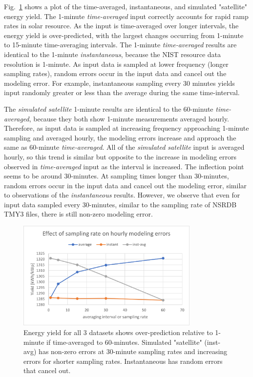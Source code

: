\documentclass[conference]{IEEEtran}
\begin{document}
Fig.~\ref{fig:NIST-energy-yield} shows a plot of the time-averaged, instantaneous, and simulated "satellite" energy yield. The 1-minute \emph{time-averaged} input correctly accounts for rapid ramp rates in solar resource. As the input is time-averaged over longer intervals, the energy yield is over-predicted, with the largest changes occurring from 1-minute to 15-minute time-averaging intervals. The 1-minute \emph{time-averaged} results are identical to the 1-minute \emph{instantaneous}, because the NIST resource data resolution is 1-minute. As input data is sampled at lower frequency (longer sampling rates), random errors occur in the input data and cancel out the modeling error. For example, instantaneous sampling every 30 minutes yields input randomly greater or less than the average during the same time-interval.

The \emph{simulated satellite} 1-minute results are identical to the 60-minute \emph{time-averaged}, because they both show 1-minute measurements averaged hourly. Therefore, as input data is sampled at increasing frequency approaching 1-minute sampling and averaged hourly, the modeling errors increase and approach the same as 60-minute \emph{time-averaged}. All of the \emph{simulated satellite} input is averaged hourly, so this trend is similar but opposite to the increase in modeling errors observed in \emph{time-averaged} input as the interval is increased. The inflection point seems to be around 30-minutes. At sampling times longer than 30-minutes, random errors occur in the input data and cancel out the modeling error, similar to observations of the \emph{instantaneous} results. However, we observe that even for input data sampled every 30-minutes, similar to the sampling rate of NSRDB TMY3 files, there is still non-zero modeling error.

\begin{figure}[htbp]
\centerline{\includegraphics[width=9cm]{NIST_energy_yield.png}}
\caption{Energy yield for all 3 datasets shows over-prediction relative to 1-minute if time-averaged to 60-minutes. Simulated "satellite" (inst-avg) has non-zero errors at 30-minute sampling rates and increasing errors for shorter sampling rates. Instantaneous has random errors that cancel out.}
\label{fig:NIST-energy-yield}
\end{figure}
\end{document}

